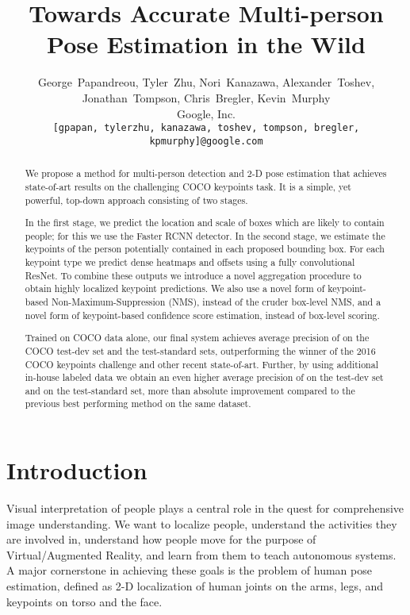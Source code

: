 \documentclass[10pt,twocolumn,letterpaper]{article}
\begin{document}
\title{Towards Accurate Multi-person Pose Estimation in the Wild}

\author{George~Papandreou,
Tyler~Zhu,
Nori~Kanazawa,
Alexander~Toshev,\\
Jonathan~Tompson,
Chris~Bregler,
Kevin~Murphy\\
Google, Inc.\\
{\tt\small [gpapan, tylerzhu, kanazawa, toshev, tompson, bregler, kpmurphy]@google.com}
}

\maketitle




\begin{abstract}
We propose a method for multi-person detection and 2-D pose estimation that achieves state-of-art results on the challenging COCO keypoints task. It is a simple, yet powerful, top-down approach consisting of two stages.

In the first stage, we predict the location and scale of boxes which are likely to contain people; for this we use the Faster RCNN detector. In the second stage, we estimate the keypoints of the person potentially contained in each proposed bounding box. For each keypoint type we predict dense heatmaps and offsets using a fully convolutional ResNet. To combine these outputs we introduce a novel aggregation procedure to obtain highly localized keypoint predictions. We also use a novel form of keypoint-based Non-Maximum-Suppression (NMS), instead of the cruder box-level NMS, and a novel form of keypoint-based confidence score estimation, instead of box-level scoring.

Trained on COCO data alone, our final system achieves average precision of  on the COCO test-dev set and the  test-standard sets, outperforming the winner of the 2016 COCO keypoints challenge and other recent state-of-art. Further, by using additional in-house labeled data we obtain an even higher average precision of  on the test-dev set and  on the test-standard set, more than  absolute improvement compared to the previous best performing method on the same dataset.
\end{abstract}
 \section{Introduction}

Visual interpretation of people plays a central role in the quest for comprehensive image understanding. We want to localize people, understand the activities they are involved in, understand how people move for the purpose of Virtual/Augmented Reality, and learn from them to teach autonomous systems. A major cornerstone in achieving these goals is the problem of human pose estimation, defined as 2-D localization of human joints on the arms, legs, and keypoints on torso and the face.
\end{document}
